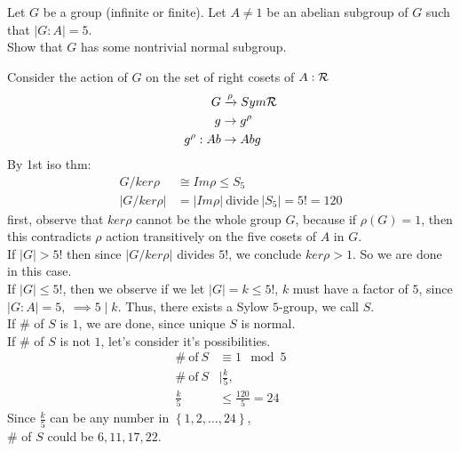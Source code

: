 \documentclass{article}
\begin{document}
\begin{homeworkProblem}
    Let $G$ be a group (infinite or finite). Let $A \neq 1$ be an abelian subgroup of $G$
    such that $\lvert G:A \rvert = 5$.\\
    Show that $G$ has some nontrivial normal subgroup.\\

    \solution
    
    Consider the action of $G$ on the set of right cosets of $A: \mathcal R$
    \begin{align}
        G &\xrightarrow[]{\rho} Sym \mathcal R\\
        g &\rightarrow g^{\rho}\\
        g^{\rho}: Ab &\rightarrow Abg
    \end{align}
    By 1st iso thm:
    \begin{align}
        G/ ker \rho &\cong Im \rho \leq S_5\\
        \lvert G / ker \rho \rvert &= \lvert Im \rho \rvert \ \text{divide} \ \lvert S_5\rvert = 5! = 120
    \end{align}
    first, observe that $ker \rho$ cannot be the whole group $G$, because if 
    $\rho (G) = 1$,
    then this contradicts $\rho$ action transitively on the five cosets 
    of $A$ in $G$. \\
    If $\lvert G \rvert > 5!$ then since $\lvert G / ker \rho \rvert$ divides $5!$,
    we conclude $ker \rho > 1$. So we are done in this case.\\

    If $\lvert G \rvert \leq 5!$, then we observe if we let 
    $\lvert G \rvert = k \leq 5!$, $k$ must have a factor of $5$,
    since $\lvert G:A \rvert = 5, \ \implies 5 \mid k$.
    Thus, there exists a Sylow $5$-group, we call $S$.\\
    If \# of $S$ is $1$, we are done, since unique $S$ is normal.\\
    If \# of $S$ is not $1$, let's consider it's possibilities.\\
    \begin{align}
        \# \ \text{of} \ S &\equiv 1 \mod 5\\
        \# \ \text{of} \ S &\mid \frac{ k }{ 5 },\\
        \frac{ k }{ 5 } &\leq \frac{ 120 }{ 5 } = 24
    \end{align}
    Since $\frac{ k }{ 5 }$ can be any number in $\left\{ 1, 2, \ldots, 24 \right\}$,\\
    \# of $S$ could be $6, 11, 17, 22$.\\


\end{homeworkProblem}
\end{document}
